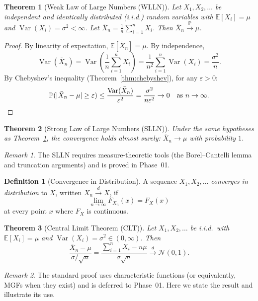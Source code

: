 \documentclass[11pt,a4paper]{article}
\theoremstyle{definition}
\newtheorem{definition}{Definition}[section]
\theoremstyle{plain}
\newtheorem{theorem}{Theorem}[section]
\theoremstyle{remark}
\newtheorem{remark}{Remark}[section]
\newcommand{\E}{\mathbb{E}}
\newcommand{\Prob}{\mathbb{P}}
\DeclareMathOperator{\Var}{Var}
\begin{document}
\begin{theorem}[Weak Law of Large Numbers (WLLN)]
\label{thm:wlln}
Let $X_1, X_2, \ldots$ be independent and identically distributed (i.i.d.) random variables
with $\E[X_i] = \mu$ and $\Var(X_i) = \sigma^2 < \infty$. Let
$\bar{X}_n = \frac{1}{n}\sum_{i=1}^n X_i$. Then $\bar{X}_n \xrightarrow{\Prob} \mu$.
\end{theorem}

\begin{proof}
By linearity of expectation, $\E[\bar{X}_n] = \mu$. By independence,
\[
    \Var(\bar{X}_n) = \Var\!\left(\frac{1}{n}\sum_{i=1}^n X_i\right)
    = \frac{1}{n^2}\sum_{i=1}^n \Var(X_i) = \frac{\sigma^2}{n}.
\]
By Chebyshev's inequality (Theorem~\ref{thm:chebyshev}), for any $\varepsilon > 0$:
\[
    \Prob(|\bar{X}_n - \mu| \geq \varepsilon)
    \leq \frac{\Var(\bar{X}_n)}{\varepsilon^2} = \frac{\sigma^2}{n\varepsilon^2}
    \to 0 \quad \text{as } n \to \infty.
    \qedhere
\]
\end{proof}

\begin{theorem}[Strong Law of Large Numbers (SLLN)]
\label{thm:slln}
Under the same hypotheses as Theorem~\ref{thm:wlln}, the convergence holds almost surely:
$\bar{X}_n \to \mu$ with probability $1$.
\end{theorem}

\begin{remark}
The SLLN requires measure-theoretic tools (the Borel--Cantelli lemma and
truncation arguments) and is proved in Phase~01.
\end{remark}

\begin{definition}[Convergence in Distribution]
\label{def:conv_dist}
A sequence $X_1, X_2, \ldots$ \emph{converges in distribution} to $X$, written
$X_n \xrightarrow{d} X$, if
\[
    \lim_{n \to \infty} F_{X_n}(x) = F_X(x)
\]
at every point $x$ where $F_X$ is continuous.
\end{definition}

\begin{theorem}[Central Limit Theorem (CLT)]
\label{thm:clt}
Let $X_1, X_2, \ldots$ be i.i.d.\ with $\E[X_i] = \mu$ and $\Var(X_i) = \sigma^2 \in
(0, \infty)$. Then
\[
    \frac{\bar{X}_n - \mu}{\sigma/\sqrt{n}} = \frac{\sum_{i=1}^n X_i - n\mu}{\sigma\sqrt{n}}
    \xrightarrow{d} \mathcal{N}(0, 1).
\]
\end{theorem}

\begin{remark}
The standard proof uses characteristic functions (or equivalently, MGFs when they exist)
and is deferred to Phase~01. Here we state the result and illustrate its use.
\end{remark}
\end{document}
